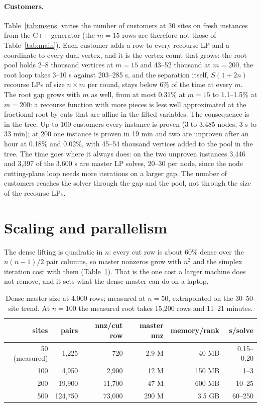 \documentclass[11pt]{article}
\begin{document}
\paragraph{Customers.} Table~\ref{tab:msens} varies the number of customers at 30 sites on fresh instances from the
C++ generator (the $m = 15$ rows are therefore not those of Table~\ref{tab:main}). Each customer adds a row to every
recourse LP and a coordinate to every dual vertex, and it is the vertex count that grows: the root pool holds 2--8
thousand vertices at $m = 15$ and 43--52 thousand at $m = 200$, the root loop takes 3--10 s against 203--285 s, and the
separation itself, $S(1+2n)$ recourse LPs of size $n \times m$ per round, stays below 6\% of the time at every $m$. The
root gap grows with $m$ as well, from at most 0.31\% at $m = 15$ to 1.1--1.5\% at $m = 200$: a recourse function with
more pieces is less well approximated at the fractional root by cuts that are affine in the lifted variables. The
consequence is in the tree. Up to 100 customers every instance is proven (3 to 3,485 nodes, 3 s to 33 min); at 200
one instance is proven in 19 min and two are unproven after an hour at 0.18\% and 0.02\%, with 45--54 thousand vertices
added to the pool in the tree. The time goes where it always does: on the two unproven instances 3,446 and 3,397 of
the 3,600 s are master LP solves, 20--30 per node, since the node cutting-plane loop needs more iterations on a larger
gap. The number of customers reaches the solver through the gap and the pool, not through the size of the recourse LPs.

\section{Scaling and parallelism}\label{sec:scaling}

The dense lifting is quadratic in $n$: every cut row is about 60\% dense over the $n(n-1)/2$ pair columns, so master
nonzeros grow with $n^2$ and the simplex iteration cost with them (Table~\ref{tab:scale}). That is the one cost a
larger machine does not remove, and it sets what the dense master can do on a laptop.

\begin{table}[ht]
\centering\small
\caption{Dense master size at 4,000 rows; measured at $n = 50$, extrapolated on the 30--50-site trend. At $n = 100$
the measured root takes 15,200 rows and 11--21 minutes.}
\label{tab:scale}
\begin{tabular}{rrrrrr}
\toprule
sites & pairs & nnz/cut row & master nnz & memory/rank & s/solve\\
\midrule
50 (measured) & 1,225 & 720 & 2.9 M & 40 MB & 0.15--0.20\\
100 & 4,950 & 2,900 & 12 M & 150 MB & 1--3\\
200 & 19,900 & 11,700 & 47 M & 600 MB & 10--25\\
500 & 124,750 & 73,000 & 290 M & 3.5 GB & 60--250\\
\bottomrule
\end{tabular}
\end{table}
\end{document}
